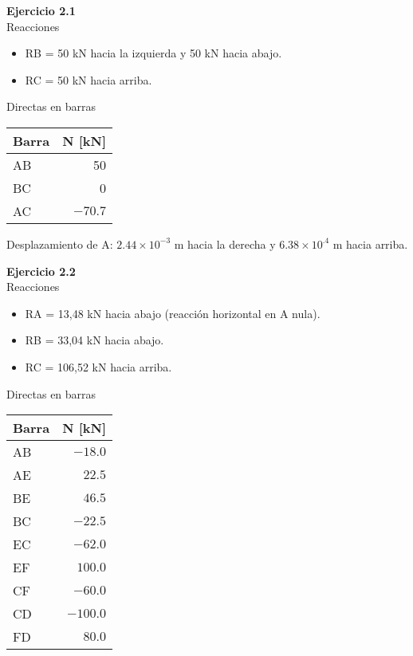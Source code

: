 \textbf{Ejercicio 2.1}\\

%
Reacciones
\begin{itemize}
\item RB = 50 kN hacia la izquierda y 50 kN hacia abajo.
\item RC = 50 kN hacia arriba.
\end{itemize}


Directas en barras
\begin{center}
\begin{tabular}{lr}
\hline
Barra & N [kN] \\
\hline
AB & 50 \\
BC & 0 \\
AC & $-70.7$\\
\hline
\end{tabular}
\end{center}

Desplazamiento de A: $2.44 \times  10^{-3}$ m hacia la derecha y $6.38 \times 10^{.4}$ m hacia arriba.\newline


\textbf{Ejercicio 2.2}\\

Reacciones
\begin{itemize}
\item RA = 13,48 kN hacia abajo (reacción horizontal en A nula).
\item RB = 33,04 kN hacia abajo.
\item  RC = 106,52 kN hacia arriba.
\end{itemize}

Directas en barras
\begin{center}
	\begin{tabular}{lr}
		\hline
Barra & N [kN] \\
\hline
AB & $-18.0$ \\
AE & $22.5$ \\
BE & $46.5$ \\
BC & $-22.5$ \\
EC & $-62.0$ \\
EF & $100.0$ \\
CF & $-60.0$ \\
CD & $-100.0$ \\
FD & $80.0$ \\
\hline
\end{tabular}
\end{center}

